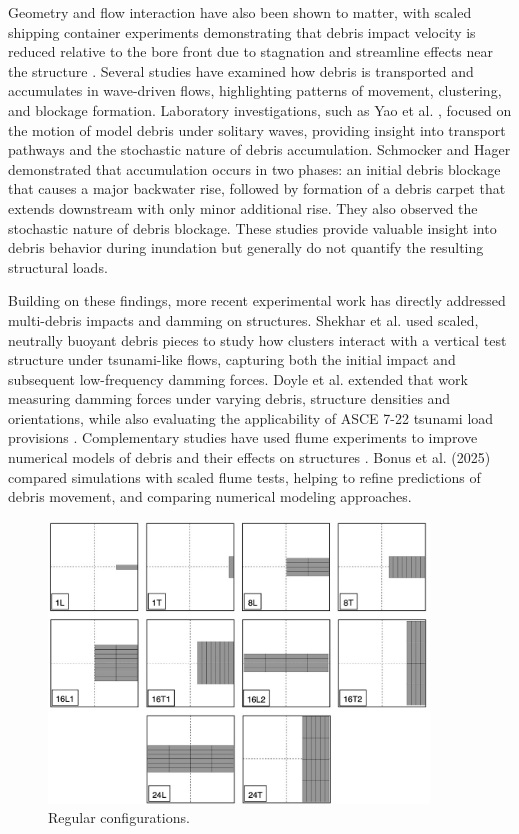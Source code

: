 \documentclass{article}
\begin{document}
Geometry and flow interaction have also been shown to matter, with scaled shipping container experiments demonstrating that debris impact velocity is reduced relative to the bore front due to stagnation and streamline effects near the structure \citep{Derschum2018}. Several studies have examined how debris is transported and accumulates in wave-driven flows, highlighting patterns of movement, clustering, and blockage formation. Laboratory investigations, such as Yao et al. \citep{Yao2014}, focused on the motion of model debris under solitary waves, providing insight into transport pathways and the stochastic nature of debris accumulation. Schmocker and Hager \citep{Schmocker2011}  demonstrated that accumulation occurs in two phases: an initial debris blockage that causes a major backwater rise, followed by formation of a debris carpet that extends downstream with only minor additional rise. They also observed the stochastic nature of debris blockage. These studies provide valuable insight into debris behavior during inundation but generally do not quantify the resulting structural loads.

Building on these findings, more recent experimental work has directly addressed multi-debris impacts and damming on structures. Shekhar et al. \citep{Shekhar2020} used scaled, neutrally buoyant debris pieces to study how  clusters interact with a vertical test structure under tsunami-like flows, capturing both the initial impact and subsequent low-frequency damming forces. Doyle et al. extended that work measuring damming forces under varying debris, structure densities and orientations, while also evaluating the applicability of ASCE 7-22 tsunami load provisions \citep{Doyle2024}. Complementary studies have used flume experiments to improve numerical models of debris and their effects on structures \citep{Bonus2022, bonusTsunamiDebrisMotion2025}. Bonus et al. (2025) compared simulations with scaled flume tests, helping to refine predictions of debris movement, and comparing numerical modeling approaches.

\begin{figure}[htbp]
    \centering
    \includegraphics[width=0.9\textwidth]{Configurations.jpg}
    \caption{Regular configurations.}
    \label{fig:configurations}
\end{figure}
\end{document}
